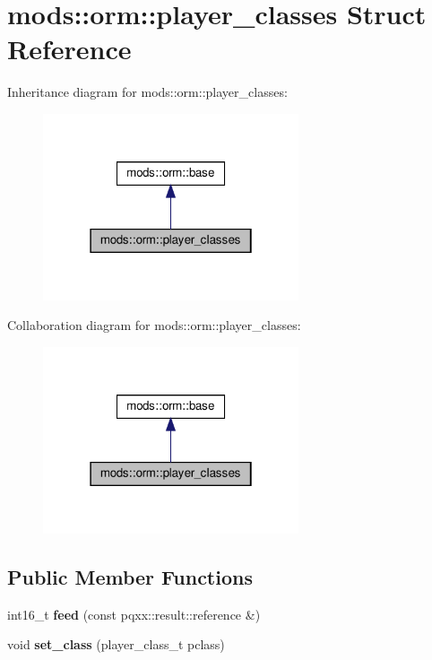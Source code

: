 \hypertarget{structmods_1_1orm_1_1player__classes}{}\section{mods\+:\+:orm\+:\+:player\+\_\+classes Struct Reference}
\label{structmods_1_1orm_1_1player__classes}


Inheritance diagram for mods\+:\+:orm\+:\+:player\+\_\+classes\+:\nopagebreak
\begin{figure}[H]
\begin{center}
\leavevmode
\includegraphics[width=214pt]{structmods_1_1orm_1_1player__classes__inherit__graph}
\end{center}
\end{figure}


Collaboration diagram for mods\+:\+:orm\+:\+:player\+\_\+classes\+:\nopagebreak
\begin{figure}[H]
\begin{center}
\leavevmode
\includegraphics[width=214pt]{structmods_1_1orm_1_1player__classes__coll__graph}
\end{center}
\end{figure}
\subsection*{Public Member Functions}
\begin{DoxyCompactItemize}
\item 
\mbox{\label{structmods_1_1orm_1_1player__classes_a6b1d1db3a5e04bfb39793c80a7fd9a75}} 
int16\+\_\+t {\bfseries feed} (const pqxx\+::result\+::reference \&)
\item 
\mbox{\label{structmods_1_1orm_1_1player__classes_a49f164f7ebf205b3fb616bc46e2568b2}} 
void {\bfseries set\+\_\+class} (player\+\_\+class\+\_\+t pclass)
\end{DoxyCompactItemize}
